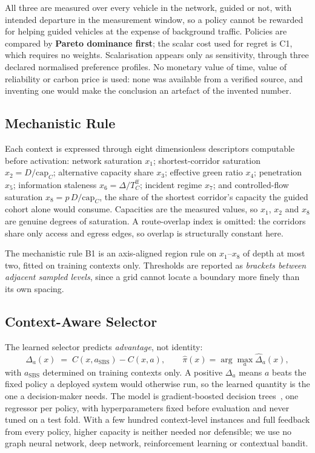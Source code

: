 All three are measured over every vehicle in the network, guided or not, with
intended departure in the measurement window, so a policy cannot be rewarded for
helping guided vehicles at the expense of background traffic. Policies are
compared by \textbf{Pareto dominance first}; the scalar cost used for regret is
C1, which requires no weights. Scalarisation appears only as sensitivity,
through three declared normalised preference profiles. No monetary value of
time, value of reliability or carbon price is used: none was available from a
verified source, and inventing one would make the conclusion an artefact of the
invented number.



\subsection{Mechanistic Rule}

Each context is expressed through eight dimensionless descriptors computable
before activation: network saturation $x_1$; shortest-corridor saturation
$x_2 = D/\mathrm{cap}_C$; alternative capacity share $x_3$; effective green
ratio $x_4$; penetration $x_5$; information staleness
$x_6 = \Delta/T^{\mathrm{ff}}_C$; incident regime $x_7$; and controlled-flow
saturation $x_8 = p\,D/\mathrm{cap}_C$, the share of the shortest corridor's
capacity the guided cohort alone would consume. Capacities are the measured
values, so $x_1$, $x_2$ and $x_8$ are genuine degrees of saturation. A
route-overlap index is omitted: the corridors share only access and egress
edges, so overlap is structurally constant here.

The mechanistic rule B1 is an axis-aligned region rule on $x_1$--$x_8$ of depth
at most two, fitted on training contexts only. Thresholds are reported as
\emph{brackets between adjacent sampled levels}, since a grid cannot locate a
boundary more finely than its own spacing.

\subsection{Context-Aware Selector}

The learned selector predicts \emph{advantage}, not identity:
\begin{equation}
\Delta_a(x) \;=\; C(x, a_{\mathrm{SBS}}) - C(x,a),
\qquad \hat{\pi}(x) = \arg\max_a \hat{\Delta}_a(x),
\label{eq:advantage}
\end{equation}
with $a_{\mathrm{SBS}}$ determined on training contexts only. A positive
$\Delta_a$ means $a$ beats the fixed policy a deployed system would otherwise
run, so the learned quantity is the one a decision-maker needs. The model is
gradient-boosted decision trees~\cite{friedman2001gbm,ke2017lightgbm}, one
regressor per policy, with hyperparameters fixed before evaluation and never
tuned on a test fold. With a few hundred context-level instances and full
feedback from every policy, higher capacity is neither needed nor defensible; we
use no graph neural network, deep network, reinforcement learning or contextual
bandit.

